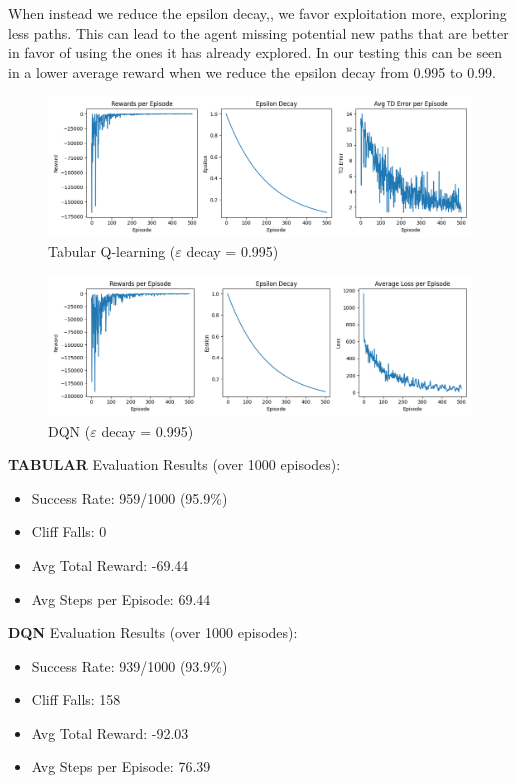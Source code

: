 \documentclass[a4paper,12pt]{article}
\begin{document}
\noindent When instead we reduce the epsilon decay,, we favor exploitation more, exploring less paths. This can lead to the agent missing potential new paths that are better in favor of using the ones it has already explored. In our testing this can be seen in a lower average reward when we reduce the epsilon decay from 0.995 to 0.99.
\begin{figure}[H]
    \centering
    \includegraphics[width=\linewidth]{1_32_0995_64_slip_tab.png}
    \caption{Tabular Q-learning ($\varepsilon$ decay = 0.995)}
\end{figure}
\begin{figure}[H]
    \centering
    \includegraphics[width=\linewidth]{1_32_0995_64_slip_dqn.png}
    \caption{DQN ($\varepsilon$ decay = 0.995)}
\end{figure}
\noindent \textbf{TABULAR} Evaluation Results (over 1000 episodes):
\begin{itemize}
    \item Success Rate: 959/1000 (95.9\%)
    \item Cliff Falls: 0
    \item Avg Total Reward: -69.44
    \item Avg Steps per Episode: 69.44
\end{itemize}
\textbf{DQN} Evaluation Results (over 1000 episodes):
\begin{itemize}
    \item Success Rate: 939/1000 (93.9\%)
    \item Cliff Falls: 158
    \item Avg Total Reward: -92.03
    \item Avg Steps per Episode: 76.39
\end{itemize}
\end{document}
